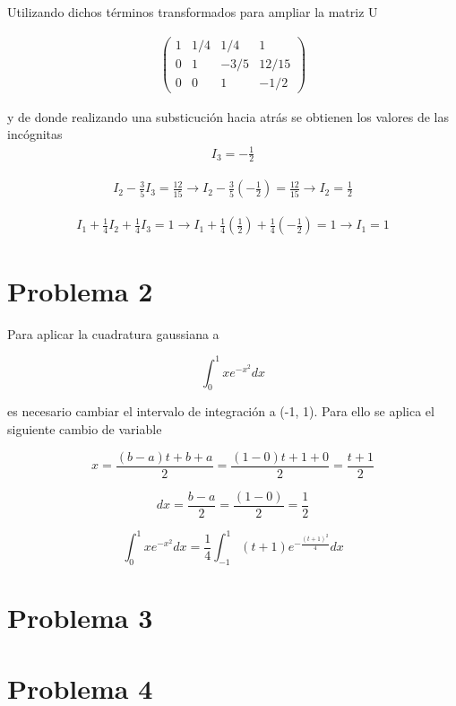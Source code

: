 \documentclass[a4paper, 12pt]{article}
\begin{document}
Utilizando dichos términos transformados para ampliar la matriz U

\begin{align*}
\begin{pmatrix}
  1 & 1/4 & 1/4 & 1\\
  0 & 1 & -3/5 & 12/15 \\
  0 & 0 & 1 & -1/2
\end{pmatrix}
\end{align*}

y de donde realizando una substicución hacia atrás se obtienen los valores de
las incógnitas
\begin{align*}
I_3 = -\frac{1}{2}
\end{align*}

\begin{align*}
I_2 - \frac{3}{5}I_3 = \frac{12}{15} 
\rightarrow
I_2 - \frac{3}{5}(-\frac{1}{2}) = \frac{12}{15}
\rightarrow
I_2 = \frac{1}{2}
\end{align*}

\begin{align*}
I_1 + \frac{1}{4}I_2 + \frac{1}{4}I_3 = 1 
\rightarrow
I_1 + \frac{1}{4}(\frac{1}{2}) + \frac{1}{4}(-\frac{1}{2}) = 1 
\rightarrow
I_1 = 1
\end{align*}

\section*{Problema 2}
Para aplicar la cuadratura gaussiana a 

\begin{equation*}
	\int^{1}_{0} x e^{-x^2} dx
\end{equation*}

es necesario cambiar el intervalo de integración a (-1, 1). Para ello se aplica
el siguiente cambio de variable

\begin{equation*}
x = \frac{(b - a)t + b + a}{2} = \frac{(1 - 0)t + 1 + 0}{2} = \frac{t + 1}{2}
\end{equation*}

\begin{equation*}
dx = \frac{b - a}{2} = \frac{(1 - 0)}{2} = \frac{1}{2}
\end{equation*}

\begin{equation*}
	\int^{1}_{0} x e^{-x^2} dx =
	\frac{1}{4}\int^{1}_{-1} (t + 1) e^{-\frac{(t + 1)^2}{4}} dx
\end{equation*}

\section*{Problema 3}

\section*{Problema 4}
\end{document}
